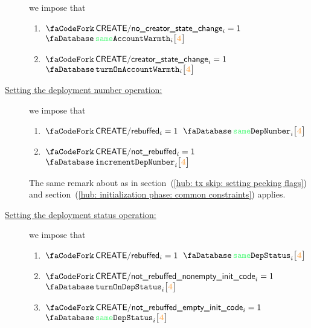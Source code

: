 \begin{description}
		we impose that
		\begin{enumerate}
			\item \If $\scenCreateNoCreatorStateChange _{i} = 1$ \Then $\accSameWarmth   {i}{\createFirstCreateeAccountRowOffset}$
			\item \If $\scenCreateCreatorStateChange   _{i} = 1$ \Then $\accTurnOnWarmth {i}{\createFirstCreateeAccountRowOffset}$
		\end{enumerate}
	\item[\underline{Setting the deployment number operation:}]
		we impose that
		\begin{enumerate}
			\item \If $\scenCreateRebuffed    _{i} = 1$ \Then $\accSameDeploymentNumber       {i}{\createFirstCreateeAccountRowOffset}$
			\item \If $\scenCreateNotRebuffed _{i} = 1$ \Then $\accIncrementDeploymentNumber  {i}{\createFirstCreateeAccountRowOffset}$
		\end{enumerate}
		\saNote{}
		The same remark about \accDeploymentNumber{} as in
		section~(\ref{hub: tx skip: setting peeking flags}) and
		section~(\ref{hub: initialization phase: common constraints}) applies.
	\item[\underline{Setting the deployment status operation:}]
		we impose that
		\begin{enumerate}
			\item \If $\scenCreateRebuffed    _{i} = 1$ \Then $\accSameDeploymentStatus       {i}{\createFirstCreateeAccountRowOffset}$
			\item \If $\scenCreateExecutionNonEmptyInitCode _{i} = 1$ \Then $\accTurnOnDepStatus {i}{\createFirstCreateeAccountRowOffset}$
			\item \If $\scenCreateExecutionEmptyInitCode    _{i} = 1$ \Then $\accSameDeploymentStatus   {i}{\createFirstCreateeAccountRowOffset}$
		\end{enumerate}
\end{description}

